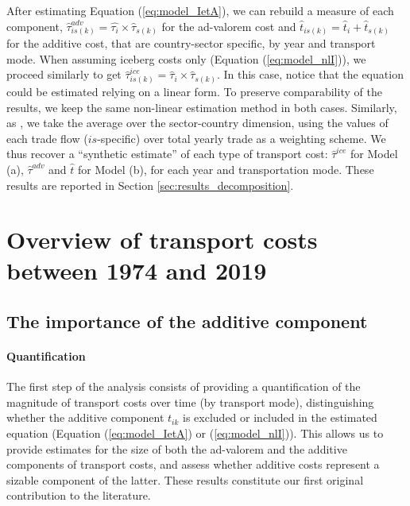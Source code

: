 \documentclass[a4paper,11pt]{article}
\begin{document}


After estimating Equation (\ref{eq:model_IetA}), we can rebuild a measure of each component, $\widehat{\tau}^{adv}_{is(k)} = \widehat{\tau_{i}} \times \widehat{\tau}_{s(k)}$ for the ad-valorem cost and $\widehat{t}_{is(k)} = \widehat{t}_{i} + \widehat{t}_{s(k)}$ for the additive cost, that are country-sector specific, by year and transport mode.
When assuming iceberg costs only (Equation (\ref{eq:model_nlI})), we proceed similarly to get $\widehat{\tau}^{ice}_{is(k)} = \widehat{\tau}_{i} \times \widehat{\tau}_{s(k)}$.
In this case, notice that the equation could be estimated relying on a linear form.
To preserve comparability of the results, we keep the same non-linear estimation method in both cases.
Similarly, as \cite{Irrazabal_2015}, we take the average over the sector-country dimension, using the values of each trade flow ($is$-specific) over total yearly trade as a weighting scheme.
We thus recover a ``synthetic estimate'' of each type of transport cost: $\widehat{\tau}^{ice}$ for Model (a), $\widehat{\tau}^{adv}$ and $\widehat{t}$ for Model (b), for each year and transportation mode.
These results are reported in Section \ref{sec:results_decomposition}.


\section{Overview of transport costs between 1974 and 2019}\label{sec:basic_results}
\subsection{The importance of the additive component \label{sec:results_decomposition}}

\paragraph{Quantification} The first step of the analysis consists of providing a quantification of the magnitude of transport costs over time (by transport mode), distinguishing whether the additive component $t_{ik}$ is excluded or included in the estimated equation (Equation (\ref{eq:model_IetA}) or (\ref{eq:model_nlI})).
This allows us to provide estimates for the size of both the ad-valorem and the additive components of transport costs, and assess whether additive costs represent a sizable component of the latter.
These results constitute our first original contribution to the literature.
\smallskip
\end{document}
